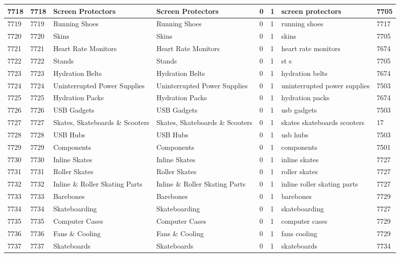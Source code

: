 \begin{longtable}{|l|l|l|l|l|l|l|l|}
7718 & 7718 & Screen Protectors & Screen Protectors & 0 & 1 & screen protectors & 7705 \\ \hline 
7719 & 7719 & Running Shoes & Running Shoes & 0 & 1 & running shoes & 7717 \\ \hline 
7720 & 7720 & Skins & Skins & 0 & 1 & skins & 7705 \\ \hline 
7721 & 7721 & Heart Rate Monitors & Heart Rate Monitors & 0 & 1 & heart rate monitors & 7674 \\ \hline 
7722 & 7722 & Stands & Stands & 0 & 1 & st s & 7705 \\ \hline 
7723 & 7723 & Hydration Belts & Hydration Belts & 0 & 1 & hydration belts & 7674 \\ \hline 
7724 & 7724 & Uninterrupted Power Supplies & Uninterrupted Power Supplies & 0 & 1 & uninterrupted power supplies & 7503 \\ \hline 
7725 & 7725 & Hydration Packs & Hydration Packs & 0 & 1 & hydration packs & 7674 \\ \hline 
7726 & 7726 & USB Gadgets & USB Gadgets & 0 & 1 & usb gadgets & 7503 \\ \hline 
7727 & 7727 & Skates, Skateboards \& Scooters & Skates, Skateboards \& Scooters & 0 & 1 & skates skateboards scooters & 17 \\ \hline 
7728 & 7728 & USB Hubs & USB Hubs & 0 & 1 & usb hubs & 7503 \\ \hline 
7729 & 7729 & Components & Components & 0 & 1 & components & 7501 \\ \hline 
7730 & 7730 & Inline Skates & Inline Skates & 0 & 1 & inline skates & 7727 \\ \hline 
7731 & 7731 & Roller Skates & Roller Skates & 0 & 1 & roller skates & 7727 \\ \hline 
7732 & 7732 & Inline \& Roller Skating Parts & Inline \& Roller Skating Parts & 0 & 1 & inline roller skating parts & 7727 \\ \hline 
7733 & 7733 & Barebones & Barebones & 0 & 1 & barebones & 7729 \\ \hline 
7734 & 7734 & Skateboarding & Skateboarding & 0 & 1 & skateboarding & 7727 \\ \hline 
7735 & 7735 & Computer Cases & Computer Cases & 0 & 1 & computer cases & 7729 \\ \hline 
7736 & 7736 & Fans \& Cooling & Fans \& Cooling & 0 & 1 & fans cooling & 7729 \\ \hline 
7737 & 7737 & Skateboards & Skateboards & 0 & 1 & skateboards & 7734 \\ \hline 

\end{longtable}
